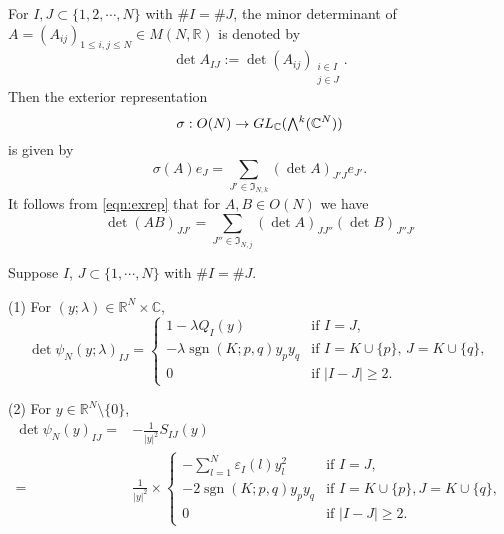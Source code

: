 For $I,J \subset \{1,2,\cdots,N\}$
 with $\# I= \# J$, 
 the minor determinant
 of $A=(A_{i j})_{1 \le i, j \le N} \in M(N,{\mathbb{R}})$
 is denoted by 
\[
\det A_{I J}:=\det(A_{i j})_{\substack{i \in I \\ j \in J}}.  
\]
Then the exterior representation
\[
  \sigma:O(N) \to GL_{\mathbb{C}}(\Exterior^k ({\mathbb{C}}^N))
\]
is given by
\begin{equation}
\label{eqn:exrep}
\sigma(A) e_J 
=
\sum_{J' \in {\mathfrak{I}}_{N, k}}
(\det A)_{J' J}e_{J'}.  
\end{equation}
It follows from \eqref{eqn:exrep}
 that for $A, B \in O(N)$
 we have
\begin{equation}
\label{eqn:klminor}
\det(A B)_{J J'}
=\sum_{J'' \in {\mathfrak{I}}_{N, j}}
(\det A)_{J J''}
(\det B)_{J'' J'}
\end{equation}



\begin{lemma}
\label{lem:psidet}
Suppose $I$, $J \subset \{1,\cdots,N\}$
 with $\# I = \# J$.  
\par\noindent
{\rm{(1)}}\enspace
For $(y;\lambda) \in {\mathbb{R}}^N \times {\mathbb{C}}$,
\[
  \det \psi_N(y; \lambda)_{IJ}
  =
  \begin{cases}
  1 -\lambda Q_I(y)
  \quad
  &\text{if } I=J,
  \\
  -\lambda \operatorname{sgn}(K;p,q) y_p y_q
  &\text{if } I=K \cup \{p\}, \, J = K \cup \{q\},
  \\
  0
  &\text{if } |I-J| \ge 2.  
  \end{cases}
\]
\par\noindent
{\rm{(2)}}\enspace
For $y \in {\mathbb{R}}^N \setminus \{0\}$,
\begin{align*}
  \det \psi_N(y)_{I J}
=&
  -\frac {1}{|y|^2} S_{I J}(y)
\\
=&
 \frac{1}{|y|^2} \times
 \begin{cases}
  -\sum_{l =1}^{N} \varepsilon_I(l) y_l^2 
 \quad
  &\text{if } I=J,
  \\
  -2 \operatorname{sgn}(K;p,q) y_p y_q
  &\text{if } I=K \cup \{p\}, J=K \cup \{q\},
  \\
  0
  &\text{if } |I-J| \ge 2.  
  \end{cases}
\end{align*}
\end{lemma}

